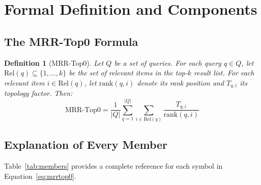 \documentclass[11pt,a4paper]{article}
\newtheorem{definition}{Definition}
\begin{document}
\section{Formal Definition and Components}
\label{sec:definition}

\subsection{The MRR-Top0 Formula}

\begin{definition}[MRR-Top0]
Let $Q$ be a set of queries.  For each query $q \in Q$, let
$\mathrm{Rel}(q) \subseteq \{1, \ldots, k\}$ be the set of relevant items
in the top-$k$ result list.  For each relevant item $i \in \mathrm{Rel}(q)$,
let $\mathrm{rank}(q,i)$ denote its rank position and $T_{q,i}$ its
\emph{topology factor}.  Then:
\begin{equation}
  \boxed{
    \mathrm{MRR\text{-}Top0}
    = \frac{1}{|Q|}
      \sum_{q=1}^{|Q|}
      \sum_{i \in \mathrm{Rel}(q)}
      \frac{T_{q,i}}{\mathrm{rank}(q,i)}
  }
  \label{eq:mrrtop0}
\end{equation}
\end{definition}

\subsection{Explanation of Every Member}

Table~\ref{tab:members} provides a complete reference for each symbol in
Equation~\eqref{eq:mrrtop0}.
\end{document}
